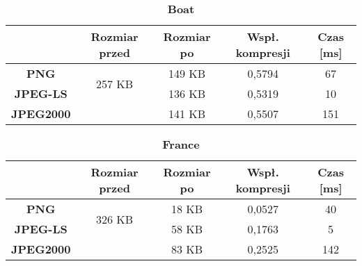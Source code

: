 \begin{table}[!h]
	\centering
	\caption{\textbf{Boat}}
	\label{my-label}
	\begin{tabular}{|c|c|c|c|c|}                                             
		\hline
		& \textbf{Rozmiar przed} & \textbf{Rozmiar po} & \textbf{Wspł. kompresji} & \textbf{Czas {[}ms{]}} \\ \hline 
		\textbf{PNG}      &          \multicolumn{1}{c|}{\multirow{2}{*}{257 KB}}             &       149 KB              &      0,5794                    &           67                  \\\cline{3-5}
		\textbf{JPEG-LS}  &                        &       136 KB              &         0,5319                 &         10                 \\\cline{3-5}
		\textbf{JPEG2000} &                        &      141 KB               &         0,5507                 &        151              \\ \hline
	\end{tabular}
\end{table}

\begin{table}[!h]
	\centering
	\caption{\textbf{France}}
	\label{my-label}
	\begin{tabular}{|c|c|c|c|c|}                                             
		\hline
		& \textbf{Rozmiar przed} & \textbf{Rozmiar po} & \textbf{Wspł. kompresji} & \textbf{Czas {[}ms{]}} \\ \hline 
		\textbf{PNG}      &          \multicolumn{1}{c|}{\multirow{2}{*}{326 KB}}             &     18  KB              &    0,0527                      &            40                 \\\cline{3-5}
		\textbf{JPEG-LS}  &                        &        58 KB             &       0,1763                   &          5                \\\cline{3-5}
		\textbf{JPEG2000} &                        &     83 KB                &      0,2525                    &         142             \\ \hline
	\end{tabular}
\end{table}

